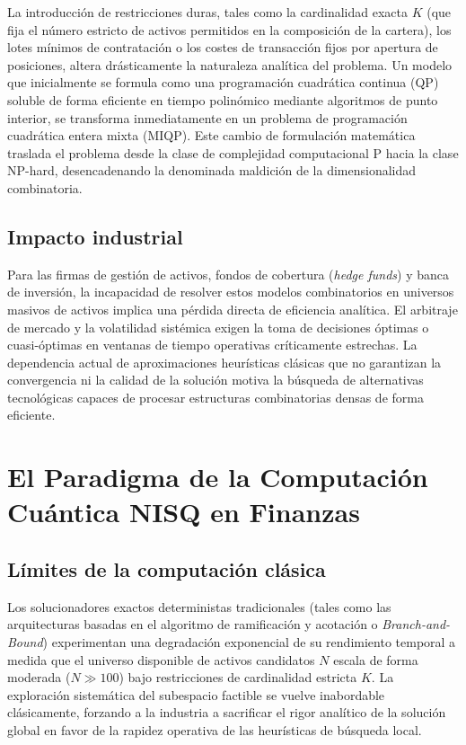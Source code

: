 La introducción de restricciones duras, tales como la cardinalidad exacta $K$ (que fija el número estricto de activos permitidos en la composición de la cartera), los lotes mínimos de contratación o los costes de transacción fijos por apertura de posiciones, altera drásticamente la naturaleza analítica del problema. Un modelo que inicialmente se formula como una programación cuadrática continua (QP) soluble de forma eficiente en tiempo polinómico mediante algoritmos de punto interior, se transforma inmediatamente en un problema de programación cuadrática entera mixta (MIQP). Este cambio de formulación matemática traslada el problema desde la clase de complejidad computacional P hacia la clase NP-hard, desencadenando la denominada maldición de la dimensionalidad combinatoria.

\subsection{Impacto industrial}
Para las firmas de gestión de activos, fondos de cobertura (\textit{hedge funds}) y banca de inversión, la incapacidad de resolver estos modelos combinatorios en universos masivos de activos implica una pérdida directa de eficiencia analítica. El arbitraje de mercado y la volatilidad sistémica exigen la toma de decisiones óptimas o cuasi-óptimas en ventanas de tiempo operativas críticamente estrechas. La dependencia actual de aproximaciones heurísticas clásicas que no garantizan la convergencia ni la calidad de la solución motiva la búsqueda de alternativas tecnológicas capaces de procesar estructuras combinatorias densas de forma eficiente.

\section{El Paradigma de la Computación Cuántica NISQ en Finanzas}
\label{sec:paradigma_cuantico}

\subsection{Límites de la computación clásica}
Los solucionadores exactos deterministas tradicionales (tales como las arquitecturas basadas en el algoritmo de ramificación y acotación o \textit{Branch-and-Bound}) experimentan una degradación exponencial de su rendimiento temporal a medida que el universo disponible de activos candidatos $N$ escala de forma moderada ($N \gg 100$) bajo restricciones de cardinalidad estricta $K$. La exploración sistemática del subespacio factible se vuelve inabordable clásicamente, forzando a la industria a sacrificar el rigor analítico de la solución global en favor de la rapidez operativa de las heurísticas de búsqueda local.

